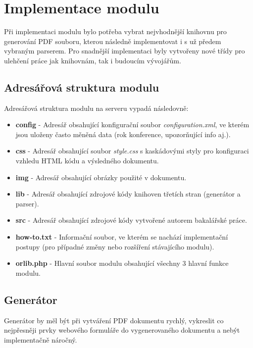 \DeclarePairedDelimiter\ceil{\lceil}{\rceil}
\DeclarePairedDelimiter\floor{\lfloor}{\rfloor}

\chapter{Implementace modulu}
Při implementaci modulu bylo potřeba vybrat nejvhodnější knihovnu pro generování PDF souboru, kterou následně implementovat i s už předem vybraným parserem. Pro snadnější implementaci byly vytvořeny nové třídy pro ulehčení práce jak knihovnám, tak i budoucím vývojářům.
\section{Adresářová struktura modulu}
Adresářová struktura modulu na serveru vypadá následovně:
\begin{itemize}
	\item \textbf{config} - Adresář obsahující konfigurační soubor \textit{configuration.xml}, ve kterém jsou uloženy často měněná data (rok konference, upozorňující info aj.).  
	\item \textbf{css} -  Adresář obsahující soubor \textit{style.css} s kaskádovými styly pro konfiguraci vzhledu HTML kódu a výsledného dokumentu. 
	\item \textbf{img} - Adresář obsahující obrázky použité v dokumentu.
	\item \textbf{lib} - Adresář obsahující zdrojové kódy knihoven třetích stran (generátor a parser).
	\item \textbf{src} - Adresář obsahující zdrojové kódy vytvořené autorem bakalářské práce.
	\item \textbf{how-to.txt} - Informační soubor, ve kterém se nachází implementační postupy (pro případné změny nebo rozšíření stávajícího modulu).
	\item \textbf{orlib.php} - Hlavní soubor modulu obsahující všechny 3 hlavní funkce modulu.
\end{itemize}

\section{Generátor}
Generátor by měl být při vytváření PDF dokumentu rychlý, vykreslit co nejpřesněji prvky webového formuláře do vygenerovaného dokumentu a nebýt implementačně náročný.  
